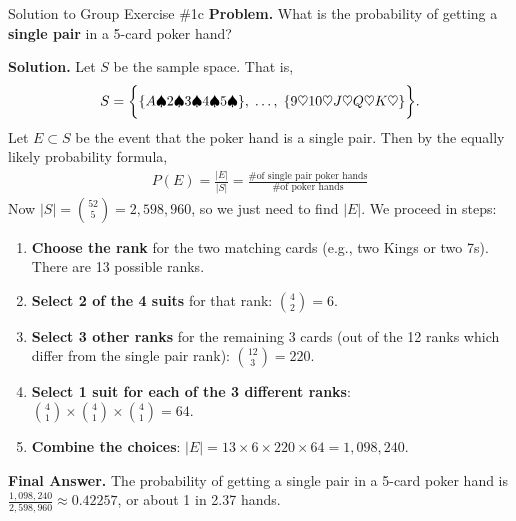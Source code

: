 \documentclass[10pt]{beamer}
\begin{document}
\begin{frame}{Solution to Group Exercise \#1c}
\footnotesize 
 \colorbox{blue!30}{\textbf{Problem.}} What is the probability of getting a \textbf{single pair} in a 5-card poker hand?
\vfill 

 \colorbox{green!30}{\textbf{Solution.}} Let $S$ be the sample space.  That is, 
\[S=\bigg\{ \{ {A\spadesuit 2 \spadesuit 3 \spadesuit 4 \spadesuit 5 \spadesuit} \}, \;   \hdots, \; \{ {9 \heartsuit 10 \heartsuit J \heartsuit Q \heartsuit K \heartsuit} \} \bigg\}. \]
Let $E \subset S$ be the event that the poker hand is a single pair. Then by the equally likely probability formula, 
\begin{align*}
P(E) = 	\frac{|E|}{|S|} = \frac{\text{\# of single pair poker hands}}{\text{\# of poker hands}}
\end{align*}
Now $|S|=\binom{52}{5} =  2,598,960$, so we just need to find $|E|$.  We proceed in steps:

\begin{enumerate} \footnotesize 
\item \textbf{Choose the rank} for the two matching cards 	(e.g., two Kings or two 7s).  There are 13 possible ranks.
\item \textbf{Select 2 of the 4 suits} for that rank:  $\binom{4}{2}=6$.
\item  \textbf{Select 3 other ranks} for the remaining 3 cards (out of the 12 ranks which differ from the single pair rank): $\binom{12}{3}=220$. 
\item \textbf{Select 1 suit for each of the 3 different ranks}: $\binom{4}{1} \times \binom{4}{1} \times \binom{4}{1} = 64.$
\item \textbf{Combine the choices}:  $|E|=13 \times 6 \times 220 \times 64 = 1,098,240$.
\end{enumerate}
\vspace{-.1cm}
\alert{\textbf{Final Answer.}} The probability of getting a single pair in a 5-card poker hand is $\frac{1,098,240}{2,598,960} \approx 0.42257$, or about 1 in 2.37 hands.
\end{frame}
\end{document}
